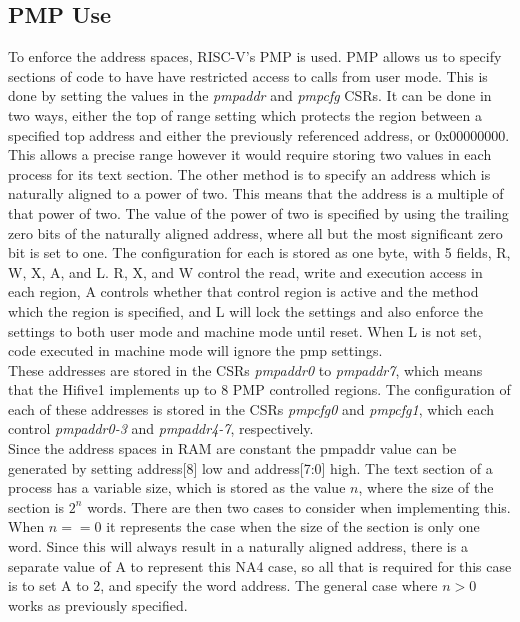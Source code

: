 \subsection{PMP Use}
To enforce the address spaces, RISC-V's PMP is used. PMP allows us to specify sections of code to have have restricted access to calls from user mode. This is done by setting the values in the \textit{pmpaddr} and \textit{pmpcfg} CSRs. It can be done in two ways, either the top of range setting which protects the region between a specified top address and either the previously referenced address, or 0x00000000. This allows a precise range however it would require storing two values in each process for its text section. The other method is to specify an address which is naturally aligned to a power of two. This means that the address is a multiple of that power of two. The value of the power of two is specified by using the trailing zero bits of the naturally aligned address, where all but the most significant zero bit is set to one. The configuration for each is stored as one byte, with 5 fields, R, W, X, A, and L. R, X, and W control the read, write and execution access in each region, A controls whether that control region is active and the method which the region is specified, and L will lock the settings and also enforce the settings to both user mode and machine mode until reset. When L is not set, code executed in machine mode will ignore the \ac{pmp} settings.\\
These addresses are stored in the CSRs \textit{pmpaddr0} to \textit{pmpaddr7}, which means that the Hifive1 implements up to 8 PMP controlled regions. The configuration of each of these addresses is stored in the CSRs \textit{pmpcfg0} and \textit{pmpcfg1}, which each control \textit{pmpaddr0-3} and \textit{pmpaddr4-7}, respectively.\\

Since the address spaces in RAM are constant the pmpaddr value can be generated by setting address[8] low and address[7:0] high. The text section of a process has a variable size, which is stored as the value \(n\), where the size of the section is \(2^n\) words. There are then two cases to consider when implementing this. When \(n == 0\) it represents the case when the size of the section is only one word. Since this will always result in a naturally aligned address, there is a separate value of A to represent this NA4 case, so all that is required for this case is to set A to 2, and specify the word address. The general case where \(n > 0\) works as previously specified. 

